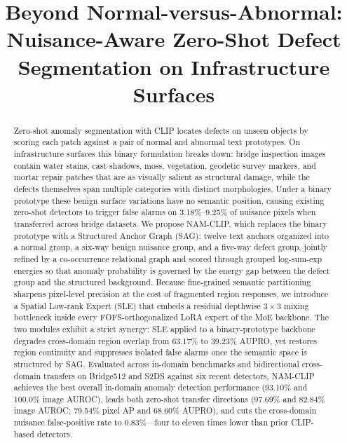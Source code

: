 \documentclass[conference]{IEEEtran}
\newcommand{\method}{NAM-CLIP}
\newcommand{\sag}{SAG}
\newcommand{\sle}{SLE}
\begin{document}
\title{Beyond Normal-versus-Abnormal: Nuisance-Aware Zero-Shot Defect Segmentation on Infrastructure Surfaces}

\author{
}

\maketitle

\begin{abstract}
Zero-shot anomaly segmentation with CLIP locates defects on unseen objects by scoring each patch against a pair of normal and abnormal text prototypes. On infrastructure surfaces this binary formulation breaks down: bridge inspection images contain water stains, cast shadows, moss, vegetation, geodetic survey markers, and mortar repair patches that are as visually salient as structural damage, while the defects themselves span multiple categories with distinct morphologies. Under a binary prototype these benign surface variations have no semantic position, causing existing zero-shot detectors to trigger false alarms on 3.18\%--9.25\% of nuisance pixels when transferred across bridge datasets. We propose \method{}, which replaces the binary prototype with a Structured Anchor Graph (\sag{}): twelve text anchors organized into a normal group, a six-way benign nuisance group, and a five-way defect group, jointly refined by a co-occurrence relational graph and scored through grouped log-sum-exp energies so that anomaly probability is governed by the energy gap between the defect group and the structured background. Because fine-grained semantic partitioning sharpens pixel-level precision at the cost of fragmented region responses, we introduce a Spatial Low-rank Expert (\sle{}) that embeds a residual depthwise $3{\times}3$ mixing bottleneck inside every FOFS-orthogonalized LoRA expert of the MoE backbone. The two modules exhibit a strict synergy: \sle{} applied to a binary-prototype backbone degrades cross-domain region overlap from 63.17\% to 39.23\% AUPRO, yet restores region continuity and suppresses isolated false alarms once the semantic space is structured by \sag{}. Evaluated across in-domain benchmarks and bidirectional cross-domain transfers on Bridge512 and S2DS against six recent detectors, \method{} achieves the best overall in-domain anomaly detection performance (93.10\% and 100.0\% image AUROC), leads both zero-shot transfer directions (97.69\% and 82.84\% image AUROC; 79.54\% pixel AP and 68.60\% AUPRO), and cuts the cross-domain nuisance false-positive rate to 0.83\%---four to eleven times lower than prior CLIP-based detectors.
\end{abstract}
\end{document}
